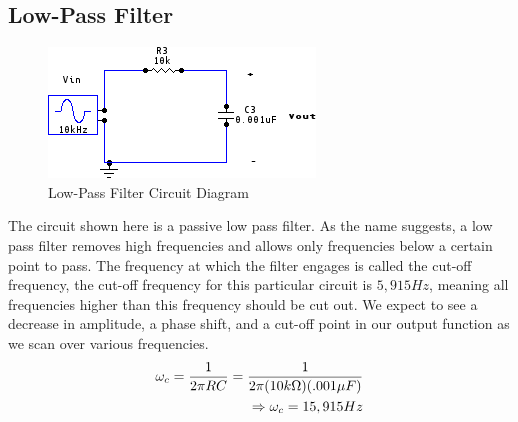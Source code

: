 \documentclass[twocolumn,english]{IEEEtran}
\theoremstyle{plain}
\theoremstyle{plain}
\begin{document}
	\subsection{Low-Pass Filter}
	\begin{figure}[H]
			\begin{centering}
			\begin{center}
			\includegraphics[width=.85\linewidth]{./Circuits/LowPassFilter.png}
			\caption{Low-Pass Filter Circuit Diagram}
			\label{diag:lowpass}
			\end{center}
			\par\end{centering}
	\end{figure}
	The circuit shown here is a passive low pass filter.
	As the name suggests, a low pass filter removes high frequencies and allows only frequencies below a certain point to pass.
	The frequency at which the filter engages is called the cut-off frequency, the cut-off frequency for this particular circuit is $5,915Hz$, meaning all frequencies higher than this frequency should be cut out.
	We expect to see a decrease in amplitude, a phase shift, and a cut-off point in our output function as we scan over various frequencies.
	\begin{align}
		\omega_c = \frac{1}{2\pi RC} = \frac{1}{2\pi (10 k\Omega)(.001 \mu F)} \\
		\Rightarrow \omega_c = 15,915 Hz \notag
	\end{align}
\end{document}

